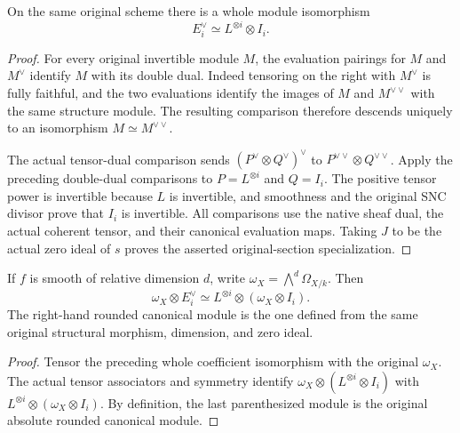 \begin{lemma}
\label{lem:kn-nadel-cyclic-dual-rounded}
\leanok
{}
On the same original scheme there is a whole module isomorphism
\[
 E_i^\vee\simeq L^{\otimes i}\otimes I_i.
\]
\end{lemma}
\begin{proof}
For every original invertible module $M$, the evaluation pairings for
$M$ and $M^\vee$ identify $M$ with its double dual.  Indeed tensoring
on the right with $M^\vee$ is fully faithful, and the two evaluations
identify the images of $M$ and $M^{\vee\vee}$ with the same structure
module.  The resulting comparison therefore descends uniquely to an
isomorphism $M\simeq M^{\vee\vee}$.

The actual tensor-dual comparison sends
$(P^\vee\otimes Q^\vee)^\vee$ to
$P^{\vee\vee}\otimes Q^{\vee\vee}$.  Apply the preceding double-dual
comparisons to $P=L^{\otimes i}$ and $Q=I_i$.
The positive tensor power is invertible because $L$ is invertible,
and smoothness and the original SNC divisor prove that $I_i$ is
invertible.  All comparisons use the native sheaf dual, the actual
coherent tensor, and their canonical evaluation maps.  Taking $J$ to
be the actual zero ideal of $s$ proves the asserted original-section
specialization.
\end{proof}

\begin{corollary}
\label{cor:kn-nadel-cyclic-canonical-rounded}
\leanok
{}
If $f$ is smooth of relative dimension $d$, write
$\omega_X=\bigwedge^d\Omega_{X/k}$.  Then
\[
 \omega_X\otimes E_i^\vee
 \simeq L^{\otimes i}\otimes(\omega_X\otimes I_i).
\]
The right-hand rounded canonical module is the one defined from the
same original structural morphism, dimension, and zero ideal.
\end{corollary}
\begin{proof}
Tensor the preceding whole coefficient isomorphism with the original
$\omega_X$.  The actual tensor associators and symmetry identify
$\omega_X\otimes(L^{\otimes i}\otimes I_i)$ with
$L^{\otimes i}\otimes(\omega_X\otimes I_i)$.  By definition, the last
parenthesized module is the original absolute rounded canonical module.
\end{proof}
